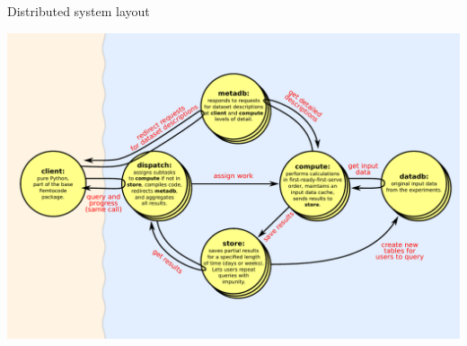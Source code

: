 \documentclass{beamer}
\begin{document}
\begin{frame}{Distributed system layout}

\vspace{0.15 cm}
\mbox{\hspace{-1.1 cm}\includegraphics[width=1.2\linewidth]{distributed-system-simplified.pdf}}
\end{frame}



\end{document}
